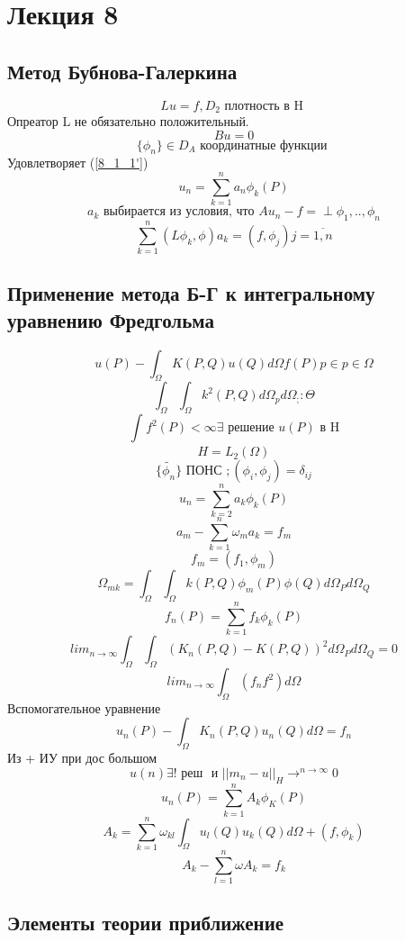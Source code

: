 \documentclass[12pt, a4paper]{article}
\begin{document}
\section{Лекция 8}

\subsection{Метод Бубнова-Галеркина}

\[ Lu = f \label{8_1_1}, D_2 \textrm{ плотность в H }\]
Опреатор L не обязательно положительный.
\[ Bu = 0 \label{8_1_1'} \]
\[ \{\phi_n\} \in D_A \textrm{ координатные функции } \]
Удовлетворяет (\ref{8_1_1'})
\[ u_n = \sum_{k=1}^{n}a_n \phi_k(P) \label{2} \]
\[ a_k \textrm{ выбирается из условия, что  } A u_n - f = \perp \phi_1, .., \phi_n \]
\[ \label{8_1_3} \sum_{k=1}^{n} (L\phi_k, \phi) a_k  = (f, \phi_j) j= \overline{1, n}\]

\subsection{Применение метода Б-Г к интегральному уравнению Фредгольма}

\[ u(P) - \int_{\Omega}^{} K(P, Q)u(Q) d\Omega f(P) \label{8_1_4} p \in p \in \Omega \]
\[ \int_{\Omega}^{}\int_{\Omega}^{} k^2 (P, Q) d\Omega_p d\Omega_;:{\Theta} \]
\[ \int_{}^{}f^2(P) < \infty \exists \textrm{ решение  } u(P) \textrm{ в H} \]
\[ H = L_2 (\Omega) \]
\[ \{ \widetilde{\phi_n} \} \textrm{ ПОНС }; (\phi_i, \phi_j) = \delta_{ij} \label{8_1_6} \]
\[ u_n = \sum_{k=2}^{n}a_k \phi_k (P) \]
\[ a_m - \sum_{k=1}^{n} \omega_m a_k =  f_m \label{8_1_7} \]
\[ f_m = (f_1, \phi_m) \]
\[ \Omega_{mk} = \int_{\Omega}^{}\int_{\Omega}^{} k(P, Q) \phi_m (P) \phi (Q) d\Omega_P d\Omega_Q \]
\[ f_n(P) = \sum_{k=1}^{n} f_k \phi_k (P) \]
\[ {lim}_{n\rightarrow \infty} \int_{\Omega}^{} \int_{\Omega}^{} (K_n (P, Q) - K(P, Q))^2 d \Omega_P d \Omega_Q = 0 \]
\[ {lim}_{n\rightarrow\infty} \int_{\Omega}^{} (f_n f^2) d\Omega \]
Вспомогательное уравнение
\[ u_n (P) - \int_{\Omega}^{} K_n (P,Q) u_n (Q)  d\Omega = f_n \]
Из + ИУ при дос большом \[ u(n) \exists!\textrm{ реш } \label{8_1_9}\textrm{  и } {||m_n - u||}_H \rightarrow^{n\rightarrow \infty} 0 \]
\[ u_n(P) = \sum_{k=1}^{n} A_k \phi_K (P) \]
\[ A_k = \sum_{k=1}^{n} \omega_{kl} \int_{\Omega}^{} u_l (Q) u_k(Q) d\Omega + (f, \phi_k) \]
\[ A_k -\sum_{l=1}^{n} \omega A_k = f_k\]

\subsection{Элементы теории приближение}
\end{document}
